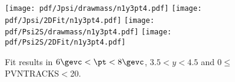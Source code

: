 \begin{figure}[H]
\begin{center}
\texttt{[image: pdf/Jpsi/drawmass/n1y3pt4.pdf]}
\texttt{[image: pdf/Jpsi/2DFit/n1y3pt4.pdf]}
\vspace*{-0.5cm}
\texttt{[image: pdf/Psi2S/drawmass/n1y3pt4.pdf]}
\texttt{[image: pdf/Psi2S/2DFit/n1y3pt4.pdf]}
\vspace*{-0.5cm}
\end{center}
\caption{Fit results in $6\gevc<\pt<8\gevc$, $3.5<y<4.5$ and 0$\leq$PVNTRACKS$<$20.}
\label{Fitn1y3pt4}
\end{figure}
